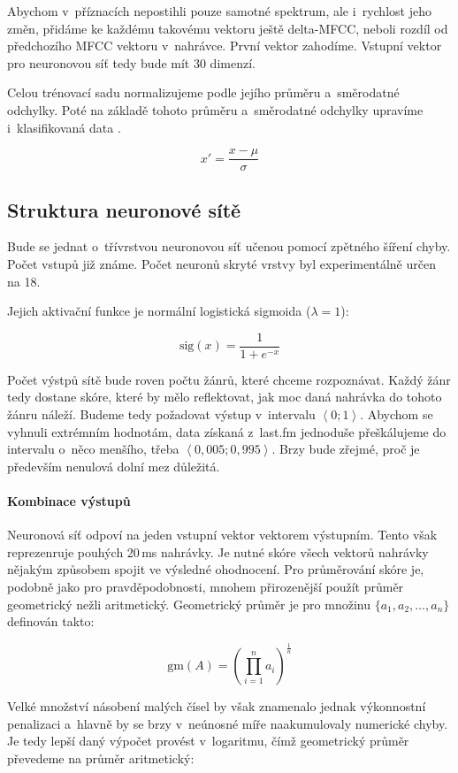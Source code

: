 \documentclass[10pt,a4paper,twocolumn]{article}
\begin{document}
Abychom v~příznacích nepostihli pouze samotné spektrum, ale i~rychlost jeho změn,
přidáme ke každému takovému vektoru ještě delta-MFCC, neboli rozdíl
od předchozího MFCC vektoru v~nahrávce. První vektor zahodíme.
Vstupní vektor pro neuronovou síť tedy bude mít 30 dimenzí.

Celou trénovací sadu normalizujeme podle jejího průměru a~směrodatné odchylky.
Poté na základě tohoto průměru a~směrodatné odchylky upravíme i~klasifikovaná data \cite{nnfaq}.

$$ x' = \frac{x-\mu}{\sigma} $$

\subsection{Struktura neuronové sítě}

Bude se jednat o~třívrstvou neuronovou síť učenou pomocí zpětného šíření chyby.
Počet vstupů již známe.
Počet neuronů skryté vrstvy byl experimentálně určen na 18.

Jejich aktivační funkce je normální logistická sigmoida ($\lambda = 1$):

$$ \mbox{sig}(x) = \frac{1}{1+e^{-x}} $$

Počet výstpů sítě bude roven počtu žánrů, které chceme rozpoznávat.
Každý žánr tedy dostane skóre, které by mělo reflektovat, jak moc daná nahrávka
do tohoto žánru náleží. Budeme tedy požadovat výstup v~intervalu $\left<0; 1\right>$.
Abychom se vyhnuli extrémním hodnotám, data získaná z~last.fm jednoduše přeškálujeme
do intervalu o~něco menšího, třeba $\left<0,005; 0,995\right>$. Brzy bude zřejmé, proč je především
nenulová dolní mez důležitá.

\paragraph{Kombinace výstupů} Neuronová síť odpoví na jeden vstupní vektor vektorem výstupním.
Tento však reprezenruje pouhých 20\,ms nahrávky.
Je nutné skóre všech vektorů nahrávky nějakým způsobem spojit ve výsledné ohodnocení.
Pro průměrování skóre je, podobně jako pro pravděpodobnosti, mnohem přirozenější
použít průměr geometrický nežli aritmetický.
Geometrický průměr je pro množinu $\{a_1,a_2,\ldots,a_n\}$ definován takto:

$$ \mbox{gm}(A) = \left(\prod_{i=1}^na_i\right)^{\frac{1}{n}} $$

Velké množství násobení malých čísel by však znamenalo jednak výkonnostní
penalizaci a~hlavně by se brzy v~neúnosné míře naakumulovaly numerické chyby.
Je tedy lepší daný výpočet provést v~logaritmu, čímž geometrický průměr
převedeme na průměr aritmetický:
\end{document}
